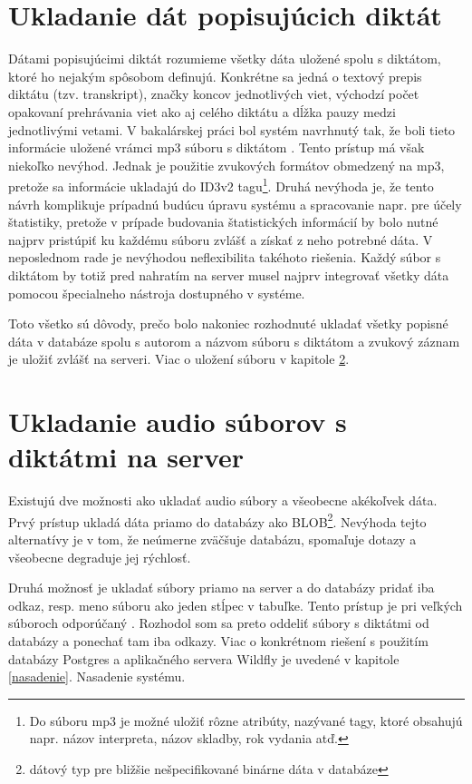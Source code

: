 \documentclass[12pt,oneside]{fithesis2}
\begin{document}
	\section{Ukladanie dát popisujúcich diktát}
	\par Dátami popisujúcimi diktát rozumieme všetky dáta uložené spolu s diktátom, ktoré ho nejakým spôsobom definujú. Konkrétne sa jedná o textový prepis diktátu (tzv. transkript), značky koncov jednotlivých viet, východzí počet opakovaní prehrávania viet ako aj celého diktátu a dĺžka pauzy medzi jednotlivými vetami. V bakalárskej práci bol systém navrhnutý tak, že boli tieto informácie uložené vrámci mp3 súboru s diktátom \cite{rumanov12}. Tento prístup má však niekoľko nevýhod. Jednak je použitie zvukových formátov obmedzený na mp3, pretože sa informácie ukladajú do ID3v2 tagu\footnote{Do súboru mp3 je možné uložiť rôzne atribúty, nazývané tagy, ktoré obsahujú napr. názov interpreta, názov skladby, rok vydania atď.}. Druhá nevýhoda je, že tento návrh komplikuje prípadnú budúcu úpravu systému a spracovanie napr. pre účely štatistiky, pretože v prípade budovania štatistických informácií by bolo nutné najprv pristúpiť ku každému súboru zvlášť a získať z neho potrebné dáta. V neposlednom rade je nevýhodou neflexibilita takéhoto riešenia. Každý súbor s diktátom by totiž pred nahratím na server musel najprv integrovať všetky dáta pomocou špecialneho nástroja dostupného v systéme.
	\par Toto všetko sú dôvody, prečo bolo nakoniec rozhodnuté ukladať všetky popisné dáta v databáze spolu s autorom a názvom súboru s diktátom a zvukový záznam je uložiť zvlášť na serveri. Viac o uložení súboru v kapitole \ref{ukladanie}.
	        
	\section{Ukladanie audio súborov s diktátmi na server} \label{ukladanie}
      \par Existujú dve možnosti ako ukladať audio súbory a všeobecne akékoľvek dáta. Prvý prístup ukladá dáta priamo do databázy ako BLOB\footnote{dátový typ pre bližšie nešpecifikované binárne dáta v databáze}. Nevýhoda tejto alternatívy je v tom, že neúmerne zväčšuje databázu, spomaľuje dotazy a všeobecne degraduje jej rýchlosť.
      \par Druhá možnosť je ukladať súbory priamo na server a do databázy pridať iba odkaz, resp. meno súboru ako jeden stĺpec v tabuľke. Tento prístup je pri veľkých súboroch odporúčaný \cite{sof1}. Rozhodol som sa preto oddeliť súbory s diktátmi od databázy a ponechať tam iba odkazy. Viac o konkrétnom riešení s použitím databázy Postgres a aplikačného servera Wildfly je uvedené v kapitole \ref{nasadenie}. Nasadenie systému.
     
\end{document}
